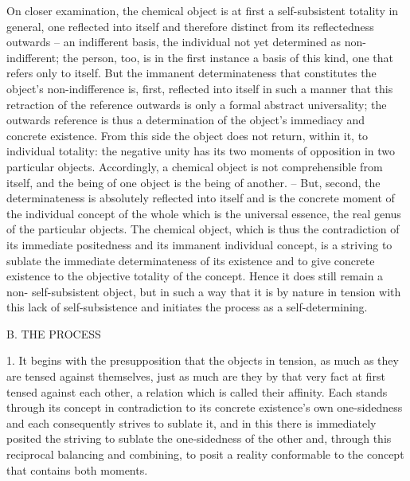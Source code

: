 On closer examination, the chemical object is at first a self-subsistent
totality in general, one reflected into itself and therefore distinct from
its reflectedness outwards – an indifferent basis, the individual not yet
determined as non-indifferent; the person, too, is in the first instance a basis
of this kind, one that refers only to itself. But the immanent determinateness
that constitutes the object's non-indifference is, first, reflected into itself in
such a manner that this retraction of the reference outwards is only a formal
abstract universality; the outwards reference is thus a determination of the
object's immediacy and concrete existence. From this side the object does
not return, within it, to individual totality: the negative unity has its two
moments of opposition in two particular objects. Accordingly, a chemical
object is not comprehensible from itself, and the being of one object is the
being of another. – But, second, the determinateness is absolutely reflected
into itself and is the concrete moment of the individual concept of the
whole which is the universal essence, the real genus of the particular objects.
The chemical object, which is thus the contradiction of its immediate
positedness and its immanent individual concept, is a striving to sublate the
immediate determinateness of its existence and to give concrete existence
to the objective totality of the concept. Hence it does still remain a non-
self-subsistent object, but in such a way that it is by nature in tension with
this lack of self-subsistence and initiates the process as a self-determining.

B. THE PROCESS

1. It begins with the presupposition
that the objects in tension,
as much as they are tensed against themselves,
just as much are they by that very fact
at first tensed against each other,
a relation which is called their affinity.
Each stands through its concept in contradiction
to its concrete existence's own one-sidedness
and each consequently strives to sublate it,
and in this there is immediately posited
the striving to sublate the one-sidedness of the other
and, through this reciprocal balancing and combining,
to posit a reality conformable to the concept
that contains both moments.

